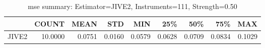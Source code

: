 \begin{table}[ht]
\centering
\caption{mse summary: Estimator=JIVE2, Instruments=111, Strength=0.50}
\begin{tabular}{lrrrrrrrr}
\toprule
 & COUNT & MEAN & STD & MIN & 25\% & 50\% & 75\% & MAX \\
\midrule
JIVE2 & 10.0000 & 0.0751 & 0.0160 & 0.0579 & 0.0628 & 0.0709 & 0.0834 & 0.1029 \\
\bottomrule
\end{tabular}
\end{table}
